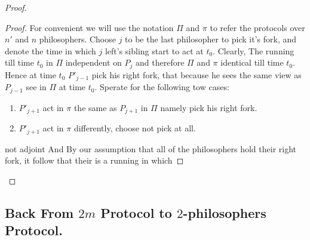 \documentclass[manuscript,screen,review]{acmart}
\begin{document}
\begin{proof}
  \begin{proof}
    For convenient we will use the notation $\Pi$ and $\pi$ to refer the protocols over $n'$ and $n$ philosophers. Choose $j$ to be the last philosopher to pick it's fork, and denote the time in which $j$ left's sibling start to act at $t_{0}$. Clearly, The running till time $t_{0}$ in $\Pi$  independent on $P_{j}$ and therefore $\Pi$ and $\pi$ identical till time $t_{0}$. Hence at time $t_{0}$ $P'_{j-1}$ pick his right fork, that because he sees the same view as $P_{j-1}$ see in $\Pi$ at time $t_{0}$. Sperate for the following tow cases: 
    \begin{enumerate}
      \item $P'_{j+1}$ act in $\pi$ the same as $P_{j+1}$ in $\Pi$ namely pick his right fork.  
      \item $P'_{j+1}$ act in $\pi$ differently, choose not pick at all. 
    \end{enumerate}
    not adjoint  And By our assumption that all of the philosophers hold their right fork, it follow that their is a running in which 
  \end{proof}

\end{proof}

\subsection{ Back From $2m$ Protocol to $2$-philosophers Protocol.}
\end{document}
